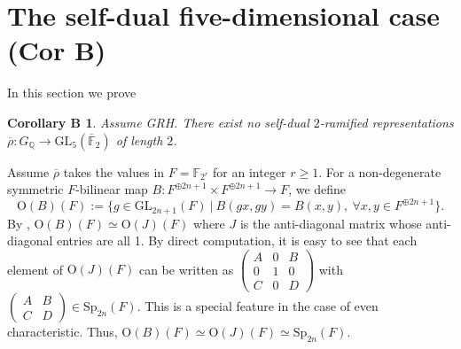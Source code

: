 \documentclass{amsart}
\newtheorem*{corB}{Corollary B}
\theoremstyle{definition}
\newcommand{\lra}{\longrightarrow}
\newcommand{\Q}{\mathbb{Q}}
\newcommand{\F}{\mathbb{F}}
\newcommand{\bF}{\overline{\F}}
\newcommand{\br}{\overline{\rho}}
\newcommand{\Sp}{\mathrm{Sp}}
\newcommand{\GL}{\mathrm{GL}}
\newcommand{\OO}{\mathrm{O}}
\renewcommand{\ge}{\geqslant}
\begin{document}
\section{The self-dual five-dimensional case (Cor B)}\label{gl5}

In this section we prove
\begin{corB}
  Assume GRH.
  There exist no self-dual $2$-ramified representations $\br:G_\Q\lra \GL_5(\bF_2)$ of length $2$.
\end{corB}

Assume $\br$ takes the values in $F=\F_{2^r}$ for an integer $r\ge 1$.
For a non-degenerate
symmetric $F$-bilinear map $B:F^{\oplus 2n+1}\times F^{\oplus 2n+1}\lra F$, we define
\begin{equation*}
  \OO(B)(F):=\{g\in \GL_{2n+1}(F)\ |\ B(gx,gy)=B(x,y),\ \forall x,y\in F^{\oplus 2n+1}\}.
\end{equation*}
By \cite[p.23, Theorem 1.5.41]{BHRD}, $\OO(B)(F)\simeq \OO(J)(F)$ where
$J$ is the anti-diagonal matrix whose anti-diagonal entries are all 1.
By direct computation, it is easy to see that each element of $\OO(J)(F)$ can be written as
$\left(\begin{array}{ccc}
      A & 0 & B \\
      0 & 1 & 0 \\
      C & 0 & D
    \end{array}
  \right)$
with
$\left(\begin{array}{cc}
      A & B \\
      C & D
    \end{array}
  \right)\in \Sp_{2n}(F)$. This is a special feature in the case of even characteristic.
Thus, $\OO(B)(F)\simeq \OO(J)(F)\simeq \Sp_{2n}(F)$.
\end{document}
